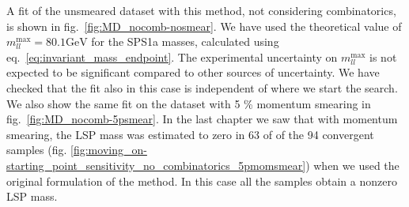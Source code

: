 \documentclass[twoside,english]{uiofysmaster}
\begin{document}
A fit of the unsmeared dataset with this method, not considering combinatorics, is shown in fig.\ \ref{fig:MD_nocomb-nosmear}. We have used the theoretical value of $m_{ll}^\mathrm{max} = 80.1 \mathrm{GeV}$ for the SPS1a masses, calculated using eq.\ \eqref{eq:invariant_mass_endpoint}. The experimental uncertainty on $m_{ll}^\mathrm{max}$ is not expected to be significant compared to other sources of uncertainty. We have checked that the fit also in this case is independent of where we start the search. We also show the same fit on the dataset with 5 \% momentum smearing in fig.\ \ref{fig:MD_nocomb-5psmear}. In the last chapter we saw that with momentum smearing, the LSP mass was estimated to zero in 63 of of the 94 convergent samples (fig. \ref{fig:moving_on-starting_point_sensitivity_no_combinatorics_5pmomsmear}) when we used the original formulation of the method. In this case all the samples obtain a nonzero LSP mass.
\end{document}
